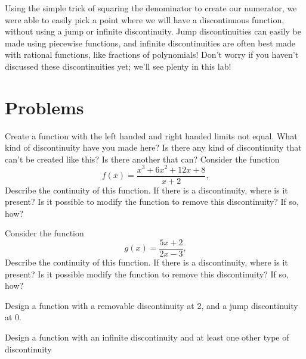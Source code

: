 \documentclass{ximera}
\begin{document}
Using the simple trick of squaring the denominator to create our numerator, we were able to easily pick a point where we will have a discontinuous function, without using a jump or infinite discontinuity. Jump discontinuities can easily be made using piecewise functions, and infinite discontinuities are often best made with rational functions, like fractions of polynomials! Don't worry if you haven't discussed these discontinuities yet; we'll see plenty in this lab!

\section{Problems}

\begin{question}
Create a function with the left handed and right handed limits not equal. What kind of discontinuity have you made here? Is there any kind of discontinuity that can't be created like this? Is there another that can?
Consider the function $$f(x) = \frac{x^3+6x^2+12x+8}{x+2} \text{,}$$ Describe the continuity of this function. If there is a discontinuity, where is it present? Is it possible to modify the function to remove this discontinuity? If so, how?
\begin{freeResponse}
\end{freeResponse}
\end{question}

\begin{question}
Consider the function $$g(x) = \frac{5x+2}{2x-3} \text{,}$$ Describe the continuity of this function. If there is a discontinuity, where is it present? Is it possible modify the function to remove this discontinuity? If so, how?
\begin{freeResponse}
\end{freeResponse}
\end{question}

\begin{question}
Design a function with a removable discontinuity at 2, and a jump discontinuity at 0.
\begin{freeResponse}
\end{freeResponse}
\end{question}

\begin{question}
Design a function with an infinite discontinuity and at least one other type of discontinuity
\begin{freeResponse}
\end{freeResponse}
\end{question}
\end{document}
